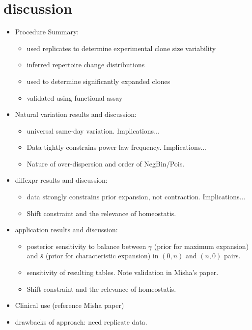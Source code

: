 \documentclass[letterpaper,english,prl,reprint,longbibliography]{revtex4-1} %
\begin{document}
\section*{discussion}
\begin{itemize}
	\item  Procedure Summary:
		\begin{itemize}
			\item  used replicates to determine experimental clone size variability
			\item  inferred repertoire change distributions 
			\item  used to determine significantly expanded clones
			\item  validated using functional assay
		\end{itemize}
	\item  Natural variation results and discussion:
		\begin{itemize}
			\item  universal same-day variation. Implications...
			\item  Data tightly constrains power law frequency. Implications...
			\item  Nature of over-dispersion and order of NegBin/Pois.
		\end{itemize}
	\item  diffexpr results and discussion:
		\begin{itemize}
			\item  data strongly constrains prior expansion, not contraction. Implications...
			\item  Shift constraint and the relevance of homeostatis.

		\end{itemize}
    \item  application results and discussion:
		\begin{itemize}
			\item  posterior sensitivity to balance between $\gamma$ (prior for maximum expansion) and $\bar{s}$ (prior for characteristic expansion) in $(0,n)$ and $(n,0)$ pairs.
			\item  sensitivity of resulting tables. Note validation in Misha's paper.
			\item  Shift constraint and the relevance of homeostatis.
		\end{itemize}
	\item  Clinical use (reference Misha paper)
	\item  drawbacks of approach: need replicate data.
\end{itemize}
\end{document}
